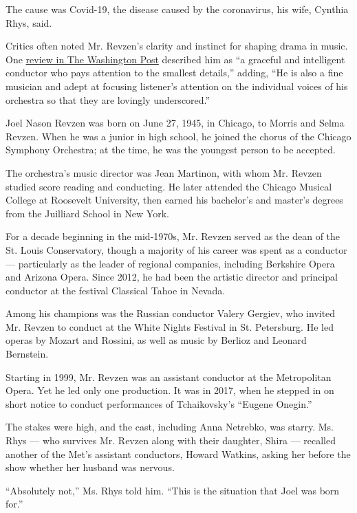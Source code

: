The cause was Covid-19, the disease caused by the coronavirus, his wife,
Cynthia Rhys, said.

Critics often noted Mr. Revzen's clarity and instinct for shaping drama
in music. One
\href{https://www.washingtonpost.com/archive/lifestyle/1996/04/02/joel-revzen/9e3d2c4a-d9eb-43d2-b2e2-74e9872e161a/}{review
in The Washington Post} described him as ``a graceful and intelligent
conductor who pays attention to the smallest details,'' adding, ``He is
also a fine musician and adept at focusing listener's attention on the
individual voices of his orchestra so that they are lovingly
underscored.''

Joel Nason Revzen was born on June 27, 1945, in Chicago, to Morris and
Selma Revzen. When he was a junior in high school, he joined the chorus
of the Chicago Symphony Orchestra; at the time, he was the youngest
person to be accepted.

The orchestra's music director was Jean Martinon, with whom Mr. Revzen
studied score reading and conducting. He later attended the Chicago
Musical College at Roosevelt University, then earned his bachelor's and
master's degrees from the Juilliard School in New York.

For a decade beginning in the mid-1970s, Mr. Revzen served as the dean
of the St. Louis Conservatory, though a majority of his career was spent
as a conductor --- particularly as the leader of regional companies,
including Berkshire Opera and Arizona Opera. Since 2012, he had been the
artistic director and principal conductor at the festival Classical
Tahoe in Nevada.

Among his champions was the Russian conductor Valery Gergiev, who
invited Mr. Revzen to conduct at the White Nights Festival in St.
Petersburg. He led operas by Mozart and Rossini, as well as music by
Berlioz and Leonard Bernstein.

Starting in 1999, Mr. Revzen was an assistant conductor at the
Metropolitan Opera. Yet he led only one production. It was in 2017, when
he stepped in on short notice to conduct performances of Tchaikovsky's
``Eugene Onegin.''

The stakes were high, and the cast, including Anna Netrebko, was starry.
Ms. Rhys --- who survives Mr. Revzen along with their daughter, Shira
--- recalled another of the Met's assistant conductors, Howard Watkins,
asking her before the show whether her husband was nervous.

``Absolutely not,'' Ms. Rhys told him. ``This is the situation that Joel
was born for.''

